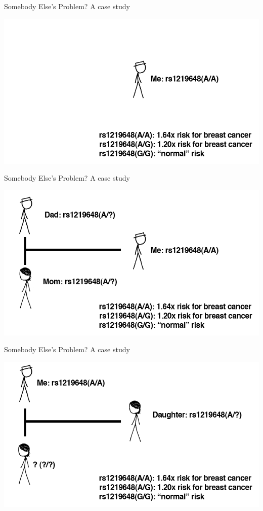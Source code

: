 \documentclass[12pt,a4paper]{beamer}
\begin{document}
\begin{frame}{Somebody Else's Problem? A case study}
\begin{center}
\includegraphics[scale=0.4]{privacy1.png} \\
\end{center}
\end{frame}

\begin{frame}{Somebody Else's Problem? A case study}
\begin{center}
\includegraphics[scale=0.4]{privacy2.png} \\
\end{center}
\end{frame}

\begin{frame}{Somebody Else's Problem? A case study}
\begin{center}
\includegraphics[scale=0.4]{privacy3.png} \\
\end{center}
\end{frame}
\end{document}
